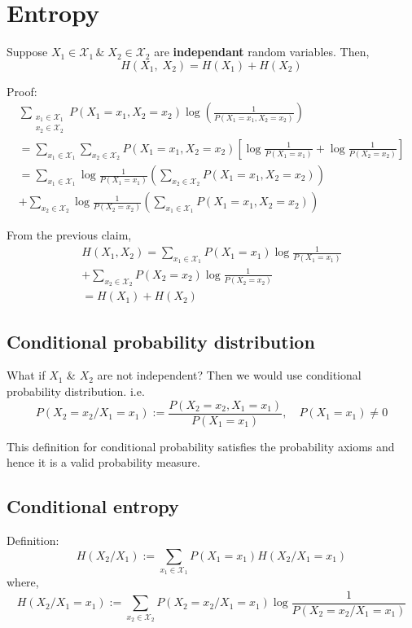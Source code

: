 \documentclass{article}
\begin{document}
\section{Entropy}

Suppose $X_1 \in \mathcal{X}_1\, \&\; X_2 \in \mathcal{X}_2$ are \textbf{independant} random variables. Then,
$$ H(X_1,\;X_2)=H(X_1)+H(X_2)$$

Proof:
\begin{gather*}
    \sum_{ \substack{x_1 \in \mathcal{X}_1 \\ x_2 \in \mathcal{X}_2}} P(X_1=x_1,X_2=x_2) \log \left( \frac{1}{P(X_1=x_1,X_2=x_2)} \right) \\
    = \sum_{x_1 \in \mathcal{X}_1 }\sum_{x_2 \in \mathcal{X}_2} P(X_1=x_1,X_2=x_2) \left[  \log \frac{1}{P(X_1=x_1)} + \log \frac{1}{P(X_2=x_2)}\right] \\
    = \sum_{x_1 \in \mathcal{X}_1 } \log \frac{1}{P(X_1=x_1)} \left( \sum_{x_2 \in \mathcal{X}_2} P(X_1=x_1,X_2=x_2)\right) \\
    + \sum_{x_2 \in \mathcal{X}_2 } \log \frac{1}{P(X_2=x_2)} \left( \sum_{x_1 \in \mathcal{X}_1} P(X_1=x_1,X_2=x_2)\right)
\end{gather*}

From the previous claim,
\begin{gather*}
    H(X_1,X_2)= \sum_{x_1 \in \mathcal{X}_1}P(X_1=x_1) \log \frac{1}{P(X_1=x_1)} \\
    + \sum_{x_2 \in \mathcal{X}_2}P(X_2=x_2) \log \frac{1}{P(X_2=x_2)} \\
    =H(X_1)+H(X_2)
\end{gather*}

\subsection{Conditional probability distribution}

What if $X_1$ \& $X_2$ are not independent? Then we would use conditional probability distribution. i.e.
$$ P(X_2=x_2/X_1=x_1):= \frac{P(X_2=x_2, X_1=x_1)}{P(X_1=x_1)}, \quad P(X_1=x_1) \neq 0 $$

This definition for conditional probability satisfies the probability axioms and hence it is a valid probability measure.

\subsection{Conditional entropy}
Definition:
$$ H(X_2/X_1):= \sum_{x_1 \in \mathcal{X}_1} P(X_1=x_1) H(X_2/X_1=x_1)$$
where,
$$ H(X_2/X_1=x_1):= \sum_{x_2 \in \mathcal{X}_2}P(X_2=x_2/X_1=x_1) \log \frac{1}{P(X_2=x_2/X_1=x_1)}$$
\end{document}
